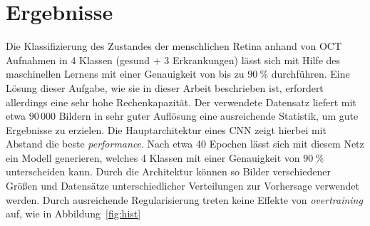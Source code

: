 \chapter{Ergebnisse}

Die Klassifizierung des Zustandes der menschlichen Retina anhand von OCT
Aufnahmen in 4 Klassen (gesund + 3 Erkrankungen) lässt sich mit Hilfe des
maschinellen Lernens mit einer Genauigkeit von bis zu $\SI{90}{\percent}$
durchführen. Eine Lösung dieser Aufgabe, wie sie in dieser Arbeit beschrieben
ist, erfordert allerdings eine sehr hohe Rechenkapazität. Der verwendete
Datensatz liefert mit etwa $90\,000$ Bildern in sehr guter Auflösung eine
ausreichende Statistik, um gute Ergebnisse zu erzielen.
Die Hauptarchitektur eines CNN zeigt hierbei mit Abstand die beste
\textit{performance}. Nach etwa 40 Epochen lässt sich mit diesem Netz ein
Modell generieren, welches 4 Klassen mit einer Genauigkeit von
$\SI{90}{\percent}$ unterscheiden kann. Durch die Architektur können so Bilder
verschiedener Größen und Datensätze unterschiedlicher Verteilungen zur
Vorhersage verwendet werden. Durch ausreichende Regularisierung treten keine
Effekte von \textit{overtraining} auf, wie in Abbildung~\ref{fig:hist}


